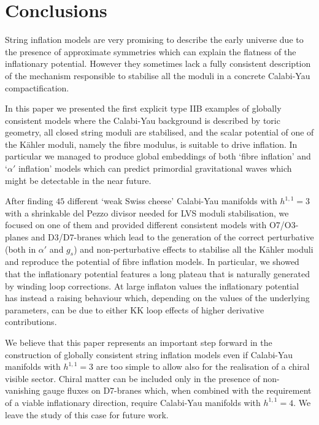 \documentclass[11pt,a4paper]{article}
\begin{document}
\section{Conclusions}
\label{Concl}

String inflation models are very promising to describe the early universe due to the presence of approximate symmetries which can explain the flatness of the inflationary potential. However they sometimes lack a fully consistent description of the mechanism responsible to stabilise all the moduli in a concrete Calabi-Yau compactification. 

In this paper we presented the first explicit type IIB examples of globally consistent models where the Calabi-Yau background is described by toric geometry, all closed string moduli are stabilised, and the scalar potential of one of the K\"ahler moduli, namely the fibre modulus, is suitable to drive inflation. In particular we managed to produce global embeddings of both `fibre inflation' \cite{Cicoli:2008gp} and `$\alpha'$ inflation' \cite{Cicoli:2016chb} models which can predict primordial gravitational waves which might be detectable in the near future. 

After finding $45$ different `weak Swiss cheese' Calabi-Yau manifolds with $h^{1,1}= 3$ with a shrinkable del Pezzo divisor needed for LVS moduli stabilisation, we focused on one of them and provided different consistent models with O7/O3-planes and D3/D7-branes which lead to the generation of the correct perturbative (both in $\alpha'$ and $g_s$) and non-perturbative effects to stabilise all the K\"ahler moduli and reproduce the potential of fibre inflation models. In particular, we showed that the inflationary potential features a long plateau that is naturally generated by winding loop corrections.  At large inflaton values the inflationary potential has instead a raising behaviour which, depending on the values of the underlying parameters, can be due to either KK loop effects of higher derivative contributions. 

We believe that this paper represents an important step forward in the construction of globally consistent string inflation models even if Calabi-Yau manifolds with $h^{1,1}=3$ are too simple to allow also for the realisation of a chiral visible sector. Chiral matter can be included only in the presence of non-vanishing gauge fluxes on D7-branes which, when combined with the requirement of a viable inflationary direction, require Calabi-Yau manifolds with $h^{1,1}=4$. We leave the study of this case for future work. 
\end{document}
